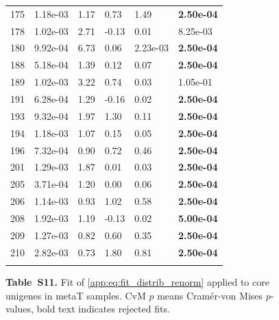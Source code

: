 \begin{figure}[htbp!]
{\begin{minipage}[t]{0.48\linewidth}
\begin{tabular}{llllll}
                    175 & 1.18e-03 & 1.17 & 0.73 & 1.49 & \textbf{2.50e-04}\\
                    178 & 1.02e-03 & 2.71 & -0.13 & 0.01 & 8.25e-03\\
                    180 & 9.92e-04 & 6.73 & 0.06 & 2.23e-03 & \textbf{2.50e-04}\\
                    188 & 5.18e-04 & 1.39 & 0.12 & 0.07 & \textbf{2.50e-04}\\
                    189 & 1.02e-03 & 3.22 & 0.74 & 0.03 & 1.05e-01\\
                    191 & 6.28e-04 & 1.29 & -0.16 & 0.02 & \textbf{2.50e-04}\\
                    193 & 9.32e-04 & 1.97 & 1.30 & 0.11 & \textbf{2.50e-04}\\
                    194 & 1.18e-03 & 1.07 & 0.15 & 0.05 & \textbf{2.50e-04}\\
                    196 & 7.32e-04 & 0.90 & 0.72 & 0.46 & \textbf{2.50e-04}\\
                    201 & 1.29e-03 & 1.87 & 0.01 & 0.03 & \textbf{2.50e-04}\\
                    205 & 3.71e-04 & 1.20 & 0.00 & 0.06 & \textbf{2.50e-04}\\
                    206 & 1.14e-03 & 0.93 & 1.02 & 0.58 & \textbf{2.50e-04}\\
                    208 & 1.92e-03 & 1.19 & -0.13 & 0.02 & \textbf{5.00e-04}\\
                    209 & 1.27e-03 & 0.82 & 0.60 & 0.35 & \textbf{2.50e-04}\\
                    210 & 2.82e-03 & 0.73 & 1.80 & 0.81 & \textbf{2.50e-04}\\
                     &  &  &  &  & \\
        \bottomrule
        \end{tabular}
    \end{minipage}
    }
    \caption*{\textbf{Table~S11.} Fit of \eqref{app:eq:fit_distrib_renorm} applied to core unigenes in metaT samples. CvM $p$ means Cram\'er-von Mises $p$-values, bold text indicates rejected fits.}
    \label{subtab:app:core:metaT:core}
\end{figure}